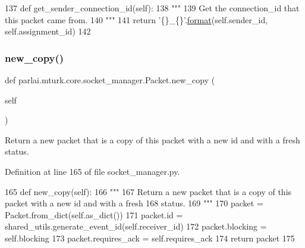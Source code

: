 \begin{DoxyCode}
137     \textcolor{keyword}{def }get\_sender\_connection\_id(self):
138         \textcolor{stringliteral}{"""}
139 \textcolor{stringliteral}{        Get the connection\_id that this packet came from.}
140 \textcolor{stringliteral}{        """}
141         \textcolor{keywordflow}{return} \textcolor{stringliteral}{'\{\}\_\{\}'}.\hyperlink{namespaceparlai_1_1chat__service_1_1services_1_1messenger_1_1shared__utils_a32e2e2022b824fbaf80c747160b52a76}{format}(self.sender\_id, self.assignment\_id)
142 
\end{DoxyCode}
\mbox{\label{classparlai_1_1mturk_1_1core_1_1socket__manager_1_1Packet_a308912fbfb5d9423d882100db5c79756}} 
\subsubsection{\texorpdfstring{new\+\_\+copy()}{new\_copy()}}
{\footnotesize\ttfamily def parlai.\+mturk.\+core.\+socket\+\_\+manager.\+Packet.\+new\+\_\+copy (\begin{DoxyParamCaption}\item[{}]{self }\end{DoxyParamCaption})}

\begin{DoxyVerb}Return a new packet that is a copy of this packet with a new id and with a fresh
status.
\end{DoxyVerb}
 

Definition at line 165 of file socket\+\_\+manager.\+py.


\begin{DoxyCode}
165     \textcolor{keyword}{def }new\_copy(self):
166         \textcolor{stringliteral}{"""}
167 \textcolor{stringliteral}{        Return a new packet that is a copy of this packet with a new id and with a fresh}
168 \textcolor{stringliteral}{        status.}
169 \textcolor{stringliteral}{        """}
170         packet = Packet.from\_dict(self.as\_dict())
171         packet.id = shared\_utils.generate\_event\_id(self.receiver\_id)
172         packet.blocking = self.blocking
173         packet.requires\_ack = self.requires\_ack
174         \textcolor{keywordflow}{return} packet
175 
\end{DoxyCode}
\mbox{\label{classparlai_1_1mturk_1_1core_1_1socket__manager_1_1Packet_a739506a92dd4482116b64e2e2d4671f2}} 

